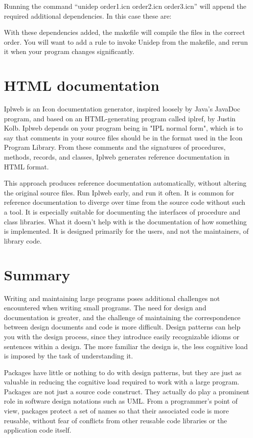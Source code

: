 Running the command {\textquotedblleft}unidep order1.icn order2.icn
order3.icn{\textquotedblright} will append the required additional
dependencies. In this case these are:


With these dependencies added, the makefile will compile the files in
the correct order. You will want to add a rule to invoke Unidep from
the makefile, and rerun it when your program changes significantly.

\section{HTML documentation}

Iplweb is an Icon documentation generator, inspired
loosely by Java's JavaDoc
program, and based on an HTML{}-generating program called
iplref, by Justin Kolb. Iplweb depends on your program being in
"IPL normal form", which is to say that
comments in your source files should be in the format
used in the Icon Program Library. From these comments and the
signatures of procedures, methods, records, and classes, Iplweb
generates reference documentation in
HTML format.

This approach produces reference documentation automatically, without
altering the original source files. Run Iplweb early, and run it
often.  It is common for reference documentation to diverge over time
from the source code without such a tool. It is
especially suitable for documenting the interfaces of procedure and
class libraries. What it doesn't help with is the documentation of how
something is implemented. It is designed primarily for the users, and
not the maintainers, of library code.

\section{Summary}

Writing and maintaining large programs poses additional challenges not
encountered when writing small programs. The need for design and documentation
is greater, and the challenge of maintaining the correspondence between design
documents and code is more difficult.  Design patterns can help you with the
design process, since they introduce easily recognizable idioms or sentences
within a design. The more familiar the design is, the less cognitive load is
imposed by the task of understanding it.

Packages have little or nothing to do with design patterns, but they
are just as valuable in reducing the cognitive load required to work
with a large program. Packages are not just a source code
construct. They actually do play a prominent role in software design
notations such as UML. From a programmer's point of view, packages
protect a set of names so that their associated code is more reusable,
without fear of conflicts from other reusable code libraries or the
application code itself.
